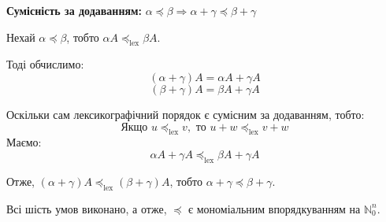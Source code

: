 \noindent \textbf{ Сумісність за додаванням:} $\alpha \preceq \beta \Rightarrow \alpha + \gamma \preceq \beta + \gamma$

Нехай $\alpha \preceq \beta$, тобто $\alpha A \preceq_{\text{lex}} \beta A$.

Тоді обчислимо:
\begin{equation*}
    (\alpha + \gamma) A = \alpha A + \gamma A
\end{equation*}
\begin{equation*}
    (\beta + \gamma) A = \beta A + \gamma A
\end{equation*}

Оскільки сам лексикографічний порядок є сумісним за додаванням, тобто:
\begin{equation*}
    \text{Якщо } u \preceq_{\text{lex}} v, \text{ то } u + w \preceq_{\text{lex}} v + w
\end{equation*}
\indent Маємо:
\begin{equation*}
    \alpha A + \gamma A \preceq_{\text{lex}} \beta A + \gamma A
\end{equation*}

Отже, $(\alpha + \gamma) A \preceq_{\text{lex}} (\beta + \gamma) A$, тобто $\alpha + \gamma \preceq \beta + \gamma$.

Всі шість умов виконано, а отже, $\preceq$ є мономіальним впорядкуванням на $\mathbb{N}_0^n$.


